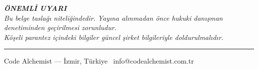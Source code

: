 \documentclass[12pt,a4paper]{article}
\begin{document}
\vspace{1em}
\begin{center}
\textit{\textbf{\"{O}NEML\.{I} UYARI}}\\
\textit{Bu belge tasla\u{g}{\i} niteli\u{g}indedir. Yay{\i}na al{\i}nmadan \"{o}nce hukuki dan{\i}\c{s}man denetiminden
ge\c{c}irilmesi zorunludur.}\\
\textit{K\"{o}\c{s}eli parantez i\c{c}indeki bilgiler g\"{u}ncel \c{s}irket bilgileriyle doldurulmal{\i}d{\i}r.}
\end{center}

\vspace{2em}
\hrule
\vspace{0.5em}
\begin{center}
\small Code Alchemist --- \.{I}zmir, T\"{u}rkiye \textbar\ info@codealchemist.com.tr
\end{center}
\end{document}
